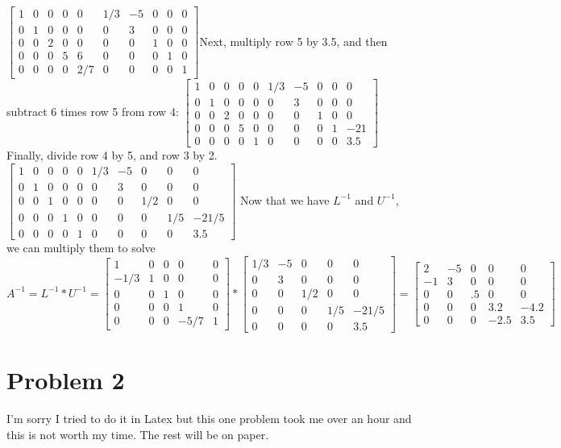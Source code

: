 \documentclass{article}
\begin{document}
$\begin{bmatrix}
1&0&0&0&0&1/3&-5&0&0&0 \\
0&1&0&0&0&0&3&0&0&0 \\
0&0&2&0&0&0&0&1&0&0 \\
0&0&0&5&6&0&0&0&1&0 \\
0&0&0&0&2/7&0&0&0&0&1
\end{bmatrix}$Next, multiply row 5 by 3.5, and then subtract 6 times row 5 from row 4:
$\begin{bmatrix}
1&0&0&0&0&1/3&-5&0&0&0 \\
0&1&0&0&0&0&3&0&0&0 \\
0&0&2&0&0&0&0&1&0&0 \\
0&0&0&5&0&0&0&0&1&-21 \\
0&0&0&0&1&0&0&0&0&3.5
\end{bmatrix}$ Finally, divide row 4 by 5, and row 3 by 2.
$\begin{bmatrix}
1&0&0&0&0&1/3&-5&0&0&0 \\
0&1&0&0&0&0&3&0&0&0 \\
0&0&1&0&0&0&0&1/2&0&0 \\
0&0&0&1&0&0&0&0&1/5&-21/5 \\
0&0&0&0&1&0&0&0&0&3.5
\end{bmatrix}$
Now that we have $L^{-1}$ and $U^{-1}$, we can multiply them to solve \\$A^{-1} =
L^{-1} * U^{-1} =
\begin{bmatrix}
1&0&0&0&0 \\
-1/3&1&0&0&0 \\
0&0&1&0&0 \\
0&0&0&1&0 \\
0&0&0&-5/7&1
\end{bmatrix} *
\begin{bmatrix}
1/3&-5&0&0&0\\
0&3&0&0&0\\
0&0&1/2&0&0 \\
0&0&0&1/5&-21/5 \\
0&0&0&0&3.5
\end{bmatrix} =
\begin{bmatrix}
2&-5&0&0&0\\
-1&3&0&0&0\\
0&0&.5&0&0\\
0&0&0&3.2&-4.2\\
0&0&0&-2.5&3.5
\end{bmatrix}
$
\section{Problem 2}
I'm sorry I tried to do it in Latex but this one problem took me over an hour and this is not worth my time.  The rest will be on paper.
\clearpage
\end{document}
